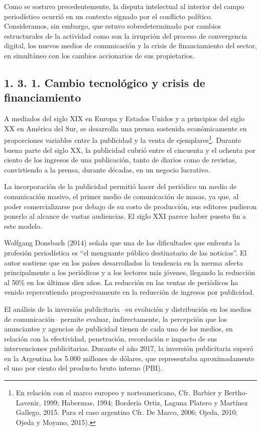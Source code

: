 {Como se sostuvo precedentemente, la disputa intelectual al interior del campo periodístico ocurrió en un contexto signado por el conflicto político. Consideramos, sin embargo, que estuvo sobredeterminado por cambios estructurales de la actividad como son la irrupción del proceso de convergencia digital, los nuevos medios de comunicación y la crisis de financiamiento del sector, en simultáneo con los cambios accionarios de sus propietarios.

\subsection{1. 3. 1. Cambio tecnológico y crisis de financiamiento}

A mediados del siglo XIX en Europa y Estados Unidos y a principios del siglo XX en América del Sur, se desarrolla una prensa sostenida económicamente en proporciones variables entre la publicidad y la venta de ejemplares\footnote{En relación con el marco europeo y norteamericano, Cfr. Barbier y Bertho-Lavenir, 1999; Habermas, 1994; Borderia Ortiz, Laguna Platero y Martínez Gallego, 2015. Para el caso argentino Cfr. De Marco, 2006; Ojeda, 2010; Ojeda y Moyano, 2015).}. Durante buena parte del siglo XX, la publicidad cubrió entre el cincuenta y el ochenta por ciento de los ingresos de una publicación, tanto de diarios como de revistas, convirtiendo a la prensa, durante décadas, en un negocio lucrativo.

La incorporación de la publicidad permitió hacer del periódico un medio de comunicación masivo, el primer medio de comunicación de masas, ya que, al poder comercializarse por debajo de su costo de producción, sus editores pudieron ponerlo al alcance de vastas audiencias. El siglo XXI parece haber puesto fin a este modelo.

Wolfgang Donsbach (2014) señala que una de las dificultades que enfrenta la profesión periodística es \enquote{el menguante público destinatario de las noticias}. El autor sostiene que en los países desarrollados la tendencia en la merma afecta principalmente a los periódicos y a los lectores más jóvenes, llegando la reducción al 50\% en los últimos diez años. La reducción en las ventas de periódicos ha venido repercutiendo progresivamente en la reducción de ingresos por publicidad.

El análisis de la inversión publicitaria --su evolución y distribución en los medios de comunicación-- permite evaluar, indirectamente, la percepción que los anunciantes y agencias de publicidad tienen de cada uno de los medios, en relación con la efectividad, penetración, recordación e impacto de sus intervenciones publicitarias. Durante el año 2017, la inversión publicitaria superó en la Argentina los 5.000 millones de dólares, que representaba aproximadamente el uno por ciento del producto bruto interno (PBI).

}

